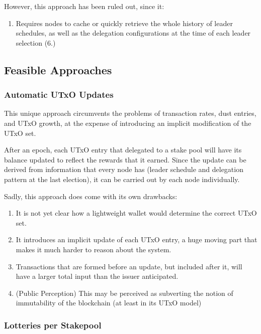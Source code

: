 \documentclass[11pt,a4paper]{article}
\begin{document}
However, this approach has been ruled out, since it:

\begin{enumerate}
\def\labelenumi{\arabic{enumi}.}
\item
  Requires nodes to cache or quickly retrieve the whole history of
  leader schedules, as well as the delegation configurations at the time
  of each leader selection (6.)
\end{enumerate}

\subsection{Feasible Approaches}\label{feasible-approaches}

\subsubsection{Automatic UTxO Updates}\label{automatic-utxo-updates}

This unique approach circumvents the problems of transaction rates, dust
entries, and UTxO growth, at the expense of introducing an implicit
modification of the UTxO set.

After an epoch, each UTxO entry that delegated to a stake pool will have
its balance updated to reflect the rewards that it earned. Since the
update can be derived from information that every node has (leader
schedule and delegation pattern at the last election), it can be carried
out by each node individually.

Sadly, this approach does come with its own drawbacks:

\begin{enumerate}
\def\labelenumi{\arabic{enumi}.}
\item
  It is not yet clear how a lightweight wallet would determine the
  correct UTxO set.
\item
  It introduces an implicit update of each UTxO entry, a huge moving
  part that makes it much harder to reason about the system.
\item
  Transactions that are formed before an update, but included after it,
  will have a larger total input than the issuer anticipated.
\item
  (Public Perception) This may be perceived as subverting the notion of
  immutability of the blockchain (at least in its UTxO model)
\end{enumerate}

\subsubsection{Lotteries per Stakepool}\label{lotteries-per-stakepool}
\end{document}
